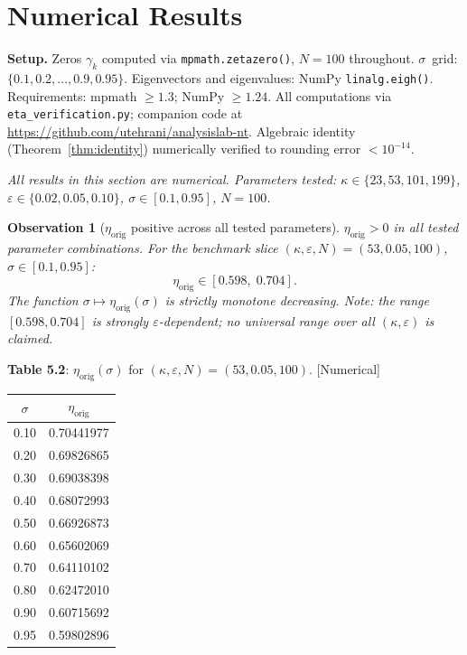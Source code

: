 \documentclass[11pt]{article}
\newtheorem{observation}[theorem]{Observation}
\newcommand{\etaorig}{\eta_{\mathrm{orig}}}
\begin{document}
\section{Numerical Results}

\textbf{Setup.}
Zeros $\gamma_k$ computed via \texttt{mpmath.zetazero()}, $N=100$ throughout.
$\sigma$~grid: $\{0.1,0.2,\ldots,0.9,0.95\}$.
Eigenvectors and eigenvalues: NumPy \texttt{linalg.eigh()}.
Requirements: mpmath $\geq 1.3$; NumPy $\geq 1.24$.
All computations via \texttt{eta\_verification.py}; companion code at
\url{https://github.com/utehrani/analysislab-nt}.
Algebraic identity (Theorem~\ref{thm:identity}) numerically verified to
rounding error $<10^{-14}$.

\emph{All results in this section are numerical. Parameters tested:
$\kappa\in\{23,53,101,199\}$, $\varepsilon\in\{0.02,0.05,0.10\}$,
$\sigma\in[0.1,0.95]$, $N=100$.}

\begin{observation}[$\etaorig$ positive across all tested parameters]
$\etaorig>0$ in all tested parameter combinations. For the benchmark slice
$(\kappa,\varepsilon,N)=(53,0.05,100)$, $\sigma\in[0.1,0.95]$:
\[
\etaorig\in[0.598,\;0.704].
\]
The function $\sigma\mapsto\etaorig(\sigma)$ is strictly monotone decreasing.
Note: the range $[0.598,0.704]$ is strongly $\varepsilon$-dependent; no
universal range over all $(\kappa,\varepsilon)$ is claimed.
\end{observation}

\textbf{Table 5.2}: $\etaorig(\sigma)$ for $(\kappa,\varepsilon,N)=(53,0.05,100)$.
[Numerical]

\begin{center}
\begin{tabular}{cc}
\toprule
$\sigma$ & $\etaorig$ \\
\midrule
0.10 & 0.70441977 \\
0.20 & 0.69826865 \\
0.30 & 0.69038398 \\
0.40 & 0.68072993 \\
0.50 & 0.66926873 \\
0.60 & 0.65602069 \\
0.70 & 0.64110102 \\
0.80 & 0.62472010 \\
0.90 & 0.60715692 \\
0.95 & 0.59802896 \\
\bottomrule
\end{tabular}
\end{center}
\end{document}
